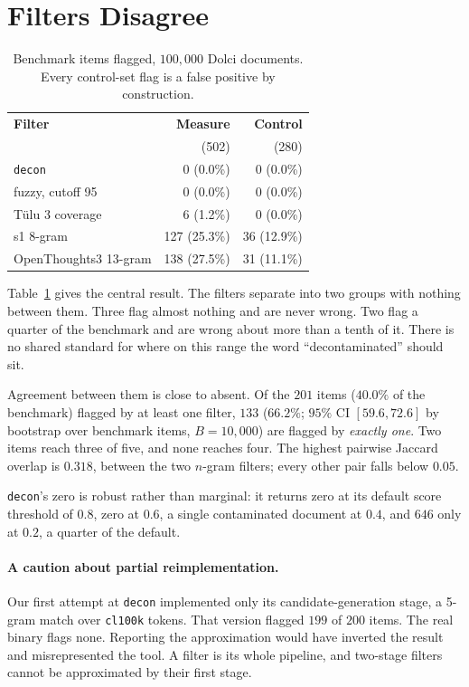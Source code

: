\documentclass[11pt]{article}
\begin{document}
\section{Filters Disagree}
\label{sec:disagree}

\begin{table}[t]
\centering
\small
\setlength{\tabcolsep}{3.5pt}
\begin{tabular}{lrr}
\toprule
\textbf{Filter} & \textbf{Measure} & \textbf{Control} \\
 & (502) & (280) \\
\midrule
\texttt{decon} & 0 (0.0\%) & 0 (0.0\%) \\
fuzzy, cutoff 95 & 0 (0.0\%) & 0 (0.0\%) \\
T\"{u}lu 3 coverage & 6 (1.2\%) & 0 (0.0\%) \\
s1 8-gram & 127 (25.3\%) & 36 (12.9\%) \\
OpenThoughts3 13-gram & 138 (27.5\%) & 31 (11.1\%) \\
\bottomrule
\end{tabular}
\caption{Benchmark items flagged, $100{,}000$ Dolci documents. Every control-set
flag is a false positive by construction.}
\label{tab:main}
\end{table}

Table~\ref{tab:main} gives the central result. The filters separate into two
groups with nothing between them. Three flag almost nothing and are never wrong.
Two flag a quarter of the benchmark and are wrong about more than a tenth of it.
There is no shared standard for where on this range the word ``decontaminated''
should sit.

Agreement between them is close to absent. Of the $201$ items ($40.0\%$ of the
benchmark) flagged by at least one filter, $133$ ($66.2\%$; $95\%$ CI
$[59.6, 72.6]$ by bootstrap over benchmark items, $B{=}10{,}000$) are flagged by
\emph{exactly one}. Two items reach three of five, and none reaches four. The
highest pairwise Jaccard overlap is $0.318$, between the two $n$-gram filters;
every other pair falls below $0.05$.

\texttt{decon}'s zero is robust rather than marginal: it returns zero at its
default score threshold of $0.8$, zero at $0.6$, a single contaminated document at
$0.4$, and $646$ only at $0.2$, a quarter of the default.

\paragraph{A caution about partial reimplementation.}
Our first attempt at \texttt{decon} implemented only its candidate-generation
stage, a 5-gram match over \texttt{cl100k} tokens. That version flagged $199$ of
$200$ items. The real binary flags none. Reporting the approximation would have
inverted the result and misrepresented the tool. A filter is its whole pipeline,
and two-stage filters cannot be approximated by their first stage.
\end{document}
